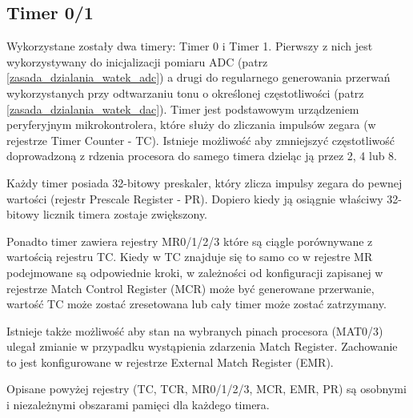 \subsection{Timer 0/1} \label{timer}

Wykorzystane zostały dwa timery: Timer 0 i Timer 1. Pierwszy z nich jest wykorzystywany do inicjalizacji pomiaru ADC (patrz \ref{zasada_dzialania_watek_adc}) a drugi do regularnego generowania przerwań wykorzystanych przy odtwarzaniu tonu o określonej częstotliwości (patrz \ref{zasada_dzialania_watek_dac}). Timer jest podstawowym urządzeniem peryferyjnym mikrokontrolera, które służy do zliczania impulsów zegara (w rejestrze Timer Counter - TC). Istnieje możliwość aby zmniejszyć częstotliwość doprowadzoną z rdzenia procesora do samego timera dzieląc ją przez 2, 4 lub 8.

Każdy timer posiada 32-bitowy preskaler, który zlicza impulsy zegara do pewnej wartości (rejestr Prescale Register - PR). Dopiero kiedy ją osiągnie właściwy 32-bitowy licznik timera zostaje zwiększony.

Ponadto timer zawiera rejestry MR0/1/2/3 które są ciągle porównywane z wartością rejestru TC. Kiedy w TC znajduje się to samo co w rejestre MR podejmowane są odpowiednie kroki, w zależności od konfiguracji zapisanej w rejestrze Match Control Register (MCR) może być generowane przerwanie, wartość TC może zostać zresetowana lub cały timer może zostać zatrzymany.

Istnieje także możliwość aby stan na wybranych pinach procesora (MAT0/3) ulegał zmianie w przypadku wystąpienia zdarzenia Match Register. Zachowanie to jest konfigurowane w rejestrze External Match Register (EMR).

Opisane powyżej rejestry (TC, TCR, MR0/1/2/3, MCR, EMR, PR) są osobnymi i niezależnymi obszarami pamięci dla każdego timera.

